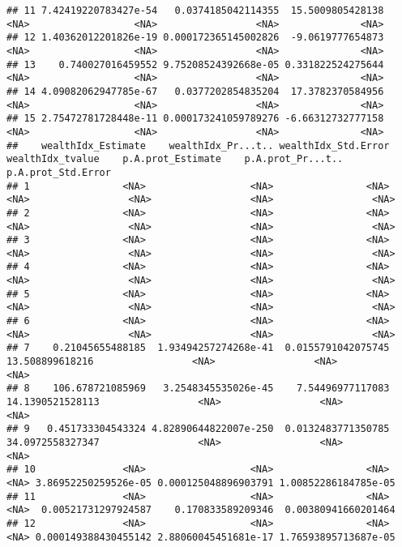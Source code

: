 \documentclass[
]{book}
\begin{document}
\begin{verbatim}
## 11 7.42419220783427e-54   0.0374185042114355  15.5009805428138                 <NA>                  <NA>                 <NA>              <NA>
## 12 1.40362012201826e-19 0.000172365145002826  -9.0619777654873                 <NA>                  <NA>                 <NA>              <NA>
## 13    0.740027016459552 9.75208524392668e-05 0.331822524275644                 <NA>                  <NA>                 <NA>              <NA>
## 14 4.09082062947785e-67   0.0377202854835204  17.3782370584956                 <NA>                  <NA>                 <NA>              <NA>
## 15 2.75472781728448e-11 0.000173241059789276 -6.66312732777158                 <NA>                  <NA>                 <NA>              <NA>
##    wealthIdx_Estimate    wealthIdx_Pr...t.. wealthIdx_Std.Error wealthIdx_tvalue    p.A.prot_Estimate    p.A.prot_Pr...t..   p.A.prot_Std.Error
## 1                <NA>                  <NA>                <NA>             <NA>                 <NA>                 <NA>                 <NA>
## 2                <NA>                  <NA>                <NA>             <NA>                 <NA>                 <NA>                 <NA>
## 3                <NA>                  <NA>                <NA>             <NA>                 <NA>                 <NA>                 <NA>
## 4                <NA>                  <NA>                <NA>             <NA>                 <NA>                 <NA>                 <NA>
## 5                <NA>                  <NA>                <NA>             <NA>                 <NA>                 <NA>                 <NA>
## 6                <NA>                  <NA>                <NA>             <NA>                 <NA>                 <NA>                 <NA>
## 7    0.21045655488185  1.93494257274268e-41  0.0155791042075745  13.508899618216                 <NA>                 <NA>                 <NA>
## 8    106.678721085969   3.2548345535026e-45    7.54496977117083 14.1390521528113                 <NA>                 <NA>                 <NA>
## 9   0.451733304543324 4.82890644822007e-250  0.0132483771350785 34.0972558327347                 <NA>                 <NA>                 <NA>
## 10               <NA>                  <NA>                <NA>             <NA> 3.86952250259526e-05 0.000125048896903791 1.00852286184785e-05
## 11               <NA>                  <NA>                <NA>             <NA>  0.00521731297924587    0.170833589209346  0.00380941660201464
## 12               <NA>                  <NA>                <NA>             <NA> 0.000149388430455142 2.88060045451681e-17 1.76593895713687e-05

\end{verbatim}
\end{document}
